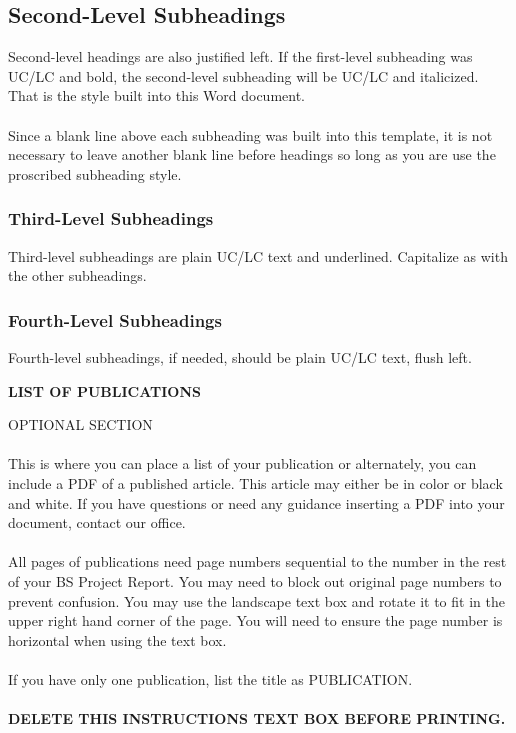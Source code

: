 \documentclass[a4paper,12pt,one side]{report}
\theoremstyle{definition}
\begin{document}
\begin{justify}
\begin{appendix}
 \subsection{Second-Level Subheadings}
 Second-level headings are also justified left. If the first-level subheading was UC/LC and bold, the second-level subheading will be UC/LC and italicized. That is the style built into this Word document.\\~\\
	Since a blank line above each subheading was built into this template, it is not necessary to leave another blank line before headings so long as you are use the proscribed subheading style.
\subsubsection{Third-Level Subheadings}
Third-level subheadings are plain UC/LC text and underlined. Capitalize as with the other subheadings. 
\subsubsection{Fourth-Level Subheadings}

Fourth-level subheadings, if needed, should be plain UC/LC text, flush left. 
\end{appendix} 
\newpage
{}
\begin{center}
\textbf {LIST OF PUBLICATIONS}
\end{center}
 \begin{tcolorbox}[enhanced jigsaw,
    sharp corners,
    boxrule=0.5pt, 
    colback=blue!30!white,   
    borderline={0.5pt}{-2pt}{black,solid} %
 ]
 \begin{justify}
OPTIONAL SECTION\\~\\
This is where you can place a list of your publication or alternately, you can include a PDF of a published article. This article may either be in color or black and white. If you have questions or need any guidance inserting a PDF into your document, contact our office.\\~\\
All pages of publications need page numbers sequential to the number in the rest of your BS Project Report. You may need to block out original page numbers to prevent confusion. You may use the landscape text box and rotate it to fit in the upper right hand corner of the page. You will need to ensure the page number is horizontal when using the text box.\\~\\
If you have only one publication, list the title as PUBLICATION.\\~\\
\bf{DELETE THIS INSTRUCTIONS TEXT BOX BEFORE PRINTING.}
\end{justify}
\end{tcolorbox}
\end{justify}
\end{document}
